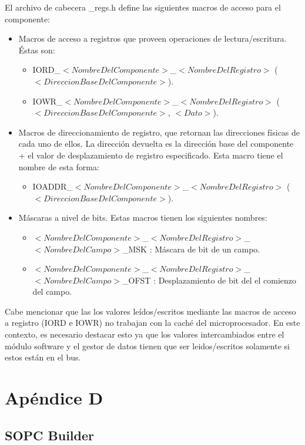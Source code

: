 El archivo de cabecera \_regs.h define las siguientes macros de acceso para el componente:
\begin{itemize}
	\item Macros de acceso a registros que proveen operaciones de lectura/escritura. Éstas son:
	\begin{itemize}
		\item IORD\_$<NombreDelComponente>$\_$<NombreDelRegistro>$ ($<DireccionBaseDelComponente>$).
		\item IOWR\_$<NombreDelComponente>$\_$<NombreDelRegistro>$ ($<DireccionBaseDelComponente>$, $<Dato>$).
	\end{itemize}
	\item Macros de direccionamiento de registro, que retornan las direcciones físicas de cada uno de ellos. La dirección devuelta es la dirección base del componente + el valor de desplazamiento de registro especificado. Esta macro tiene el nombre de esta forma:
	\begin{itemize}
		\item IOADDR\_$<NombreDelComponente>$\_$<NombreDelRegistro>$ ($<DireccionBaseDelComponente>$).
	\end{itemize}
	\item Máscaras a nivel de bits. Estas macros tienen los siguientes nombres:
	\begin{itemize}
		\item $<NombreDelComponente>$\_$<NombreDelRegistro>$\_$<NombreDelCampo>$\_MSK : Máscara de bit de un campo.
		\item $<NombreDelComponente>$\_$<NombreDelRegistro>$\_$<NombreDelCampo>$\_OFST : Desplazamiento de bit del el comienzo del campo.
	\end{itemize}
\end{itemize}

Cabe mencionar que las los valores leídos/escritos mediante las macros de acceso a registro (IORD e IOWR) no trabajan con la caché del microprocesador.
En este contexto, es necesario destacar esto ya que los valores intercambiados entre el módulo software y el gestor de datos tienen que ser leidos/escritos solamente si estos están en el bus.

\chapter{Apéndice D}
\section*{SOPC Builder}

